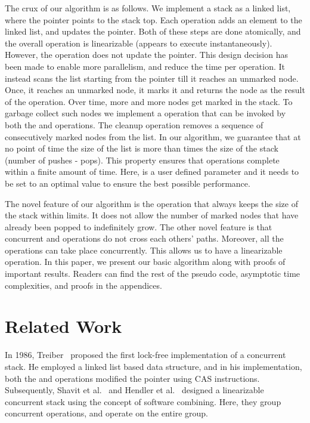 \documentclass{llncs}
\begin{document}
The crux of our algorithm is as follows. We implement a stack as a linked list, where the  pointer
points to the stack top. Each  operation adds an element to the linked list, and updates the  pointer.
Both of these steps are done atomically, and the overall operation is linearizable (appears
to execute instantaneously). However, the  
operation does not update the  pointer. This design decision has been made to enable more parallelism,
and reduce the time per operation. It instead scans the list starting from the  pointer till
it reaches an unmarked node. Once, it reaches an unmarked node, it marks it and returns the node as the result
of the  operation. Over time, more and more nodes get marked in the stack. To garbage collect such
nodes we implement a  operation that can be invoked by both the  and  operations.
The cleanup operation removes a sequence of  consecutively marked nodes from the list. In our algorithm,
we guarantee that at no point of time the size of the list is more than  times the size of the stack
(number of pushes - pops). This property ensures that  operations complete within a finite amount of
time. Here,  is a user defined parameter and it needs to be set to an optimal value to ensure the best
possible performance. 

The novel feature of our algorithm is the  operation that always keeps the size of the stack
within limits. It does not allow the number of marked nodes that have already been popped to indefinitely
grow. The other novel feature is that concurrent  and  operations do not cross each others' paths. 
Moreover, all the  operations can take place concurrently. This allows us to have a linearizable operation. 
In this paper, we present our basic algorithm along with proofs of important results. Readers can find
the rest of the pseudo code, asymptotic time complexities, and proofs in the appendices. 

\section{Related Work}
\label{sec:rel}
\vspace{-2mm}
In 1986, Treiber~\cite{CopingWithPara} proposed the first lock-free
implementation of a concurrent stack.  He employed a linked list based data
structure, and in his implementation, both the  and 
operations modified the  pointer using CAS instructions.  
Subsequently, Shavit et
al.~\cite{combiningFunnels} and Hendler et al.~\cite{flatCombining} designed a
linearizable concurrent stack using the concept of software combining. Here,
they group concurrent operations, and operate on the entire group.
\end{document}

